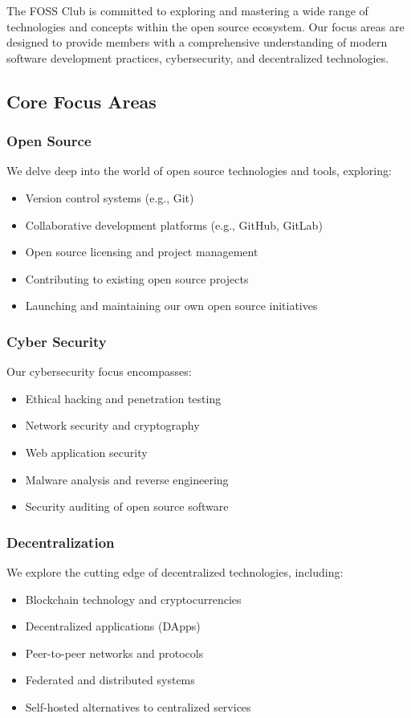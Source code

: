\documentclass[12pt,a4paper]{article}
\begin{document}
The FOSS Club is committed to exploring and mastering a wide range of technologies and concepts within the open source ecosystem. Our focus areas are designed to provide members with a comprehensive understanding of modern software development practices, cybersecurity, and decentralized technologies.

\subsection{Core Focus Areas}

\subsubsection{Open Source}
We delve deep into the world of open source technologies and tools, exploring:
\begin{itemize}
    \item Version control systems (e.g., Git)
    \item Collaborative development platforms (e.g., GitHub, GitLab)
    \item Open source licensing and project management
    \item Contributing to existing open source projects
    \item Launching and maintaining our own open source initiatives
\end{itemize}

\subsubsection{Cyber Security}
Our cybersecurity focus encompasses:
\begin{itemize}
    \item Ethical hacking and penetration testing
    \item Network security and cryptography
    \item Web application security
    \item Malware analysis and reverse engineering
    \item Security auditing of open source software
\end{itemize}

\subsubsection{Decentralization}
We explore the cutting edge of decentralized technologies, including:
\begin{itemize}
    \item Blockchain technology and cryptocurrencies
    \item Decentralized applications (DApps)
    \item Peer-to-peer networks and protocols
    \item Federated and distributed systems
    \item Self-hosted alternatives to centralized services
\end{itemize}
\end{document}
